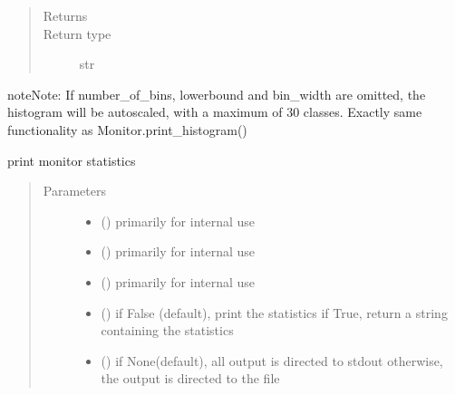 \documentclass[letterpaper,10pt,english]{sphinxmanual}
\begin{document}
\begin{fulllineitems}
\begin{fulllineitems}
\begin{quote}
\begin{description}
\item[{Returns}] \leavevmode
{}

\item[{Return type}] \leavevmode
str

\end{description}\end{quote}

\begin{sphinxadmonition}{note}{Note:}
If number\_of\_bins, lowerbound and bin\_width are omitted, the histogram will be autoscaled,
with a maximum of 30 classes. 
Exactly same functionality as Monitor.print\_histogram()
\end{sphinxadmonition}

\end{fulllineitems}


\begin{fulllineitems}
\label{\detokenize{Reference:salabim.Monitor.print_statistics}}
print monitor statistics
\begin{quote}\begin{description}
\item[{Parameters}] \leavevmode\begin{itemize}
\item {} 
 () \textendash{} primarily for internal use

\item {} 
 () \textendash{} primarily for internal use

\item {} 
 () \textendash{} primarily for internal use

\item {} 
 () \textendash{} if False (default), print the statistics
if True, return a string containing the statistics

\item {} 
 () \textendash{} if None(default), all output is directed to stdout 
otherwise, the output is directed to the file


\end{itemize}
\end{description}
\end{quote}
\end{fulllineitems}
\end{fulllineitems}
\end{document}

